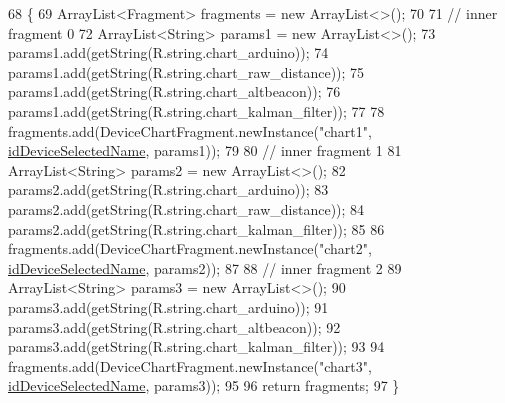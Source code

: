 \begin{DoxyCode}
68                                                \{
69         ArrayList<Fragment> fragments = \textcolor{keyword}{new} ArrayList<>();
70 
71         \textcolor{comment}{// inner fragment 0}
72         ArrayList<String> params1 = \textcolor{keyword}{new} ArrayList<>();
73         params1.add(getString(R.string.chart\_arduino));
74         params1.add(getString(R.string.chart\_raw\_distance));
75         params1.add(getString(R.string.chart\_altbeacon));
76         params1.add(getString(R.string.chart\_kalman\_filter));
77 
78         fragments.add(DeviceChartFragment.newInstance(\textcolor{stringliteral}{"chart1"}, 
      \hyperlink{classit_1_1unibo_1_1torsello_1_1bluetoothpositioning_1_1fragment_1_1DeviceDetailInner2Fragment_a84cd6ba00a3c2e8b7a53cac62c73f1b5_a84cd6ba00a3c2e8b7a53cac62c73f1b5}{idDeviceSelectedName}, params1));
79 
80         \textcolor{comment}{// inner fragment 1}
81         ArrayList<String> params2 = \textcolor{keyword}{new} ArrayList<>();
82         params2.add(getString(R.string.chart\_arduino));
83         params2.add(getString(R.string.chart\_raw\_distance));
84         params2.add(getString(R.string.chart\_kalman\_filter));
85 
86         fragments.add(DeviceChartFragment.newInstance(\textcolor{stringliteral}{"chart2"}, 
      \hyperlink{classit_1_1unibo_1_1torsello_1_1bluetoothpositioning_1_1fragment_1_1DeviceDetailInner2Fragment_a84cd6ba00a3c2e8b7a53cac62c73f1b5_a84cd6ba00a3c2e8b7a53cac62c73f1b5}{idDeviceSelectedName}, params2));
87 
88         \textcolor{comment}{// inner fragment 2}
89         ArrayList<String> params3 = \textcolor{keyword}{new} ArrayList<>();
90         params3.add(getString(R.string.chart\_arduino));
91         params3.add(getString(R.string.chart\_altbeacon));
92         params3.add(getString(R.string.chart\_kalman\_filter));
93 
94         fragments.add(DeviceChartFragment.newInstance(\textcolor{stringliteral}{"chart3"}, 
      \hyperlink{classit_1_1unibo_1_1torsello_1_1bluetoothpositioning_1_1fragment_1_1DeviceDetailInner2Fragment_a84cd6ba00a3c2e8b7a53cac62c73f1b5_a84cd6ba00a3c2e8b7a53cac62c73f1b5}{idDeviceSelectedName}, params3));
95 
96         \textcolor{keywordflow}{return} fragments;
97     \}
\end{DoxyCode}
\hypertarget{classit_1_1unibo_1_1torsello_1_1bluetoothpositioning_1_1fragment_1_1DeviceDetailInner2Fragment_a27471a2d140a8dd11636ef23ffc20657_a27471a2d140a8dd11636ef23ffc20657}{}\label{classit_1_1unibo_1_1torsello_1_1bluetoothpositioning_1_1fragment_1_1DeviceDetailInner2Fragment_a27471a2d140a8dd11636ef23ffc20657_a27471a2d140a8dd11636ef23ffc20657} 
